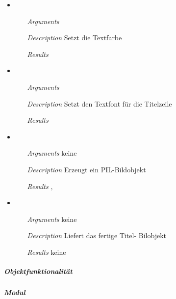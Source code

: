 \begin{itemize}
\item {}
\begin{enumerate}
\item[\textit{Arguments}] 
\item[\textit{Description}] Setzt die Textfarbe
\item[\textit{Results}] 
\end{enumerate}

\item {}
\begin{enumerate}
\item[\textit{Arguments}] 
\item[\textit{Description}] Setzt den Textfont f\"ur die Titelzeile
\item[\textit{Results}] 
\end{enumerate}

\item {}
\begin{enumerate}
\item[\textit{Arguments}] keine
\item[\textit{Description}] Erzeugt ein PIL-Bildobjekt
\item[\textit{Results}] ,
\end{enumerate}

\item {}
\begin{enumerate}
\item[\textit{Arguments}] keine
\item[\textit{Description}] Liefert das fertige Titel- Bilobjekt
\item[\textit{Results}] keine
\end{enumerate}

\end{itemize}


\newpage

\subparagraph{Objektfunktionalit\"at}


\newpage

\paragraph{}
\subparagraph{Modul} 

